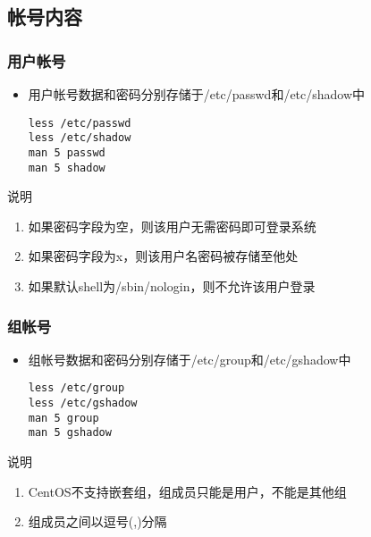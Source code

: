 \documentclass[xcolor=svgnames,presentation]{beamer}
\begin{document}
\subsection{帐号内容}
\label{sec-1-2}
\begin{frame}[fragile]
\frametitle{用户帐号}
\label{sec-1-2-1}
\begin{itemize}

\item 用户帐号数据和密码分别存储于/etc/passwd和/etc/shadow中\\
\label{sec-1-2-1-1}%
\begin{verbatim}
less /etc/passwd
less /etc/shadow
man 5 passwd
man 5 shadow
\end{verbatim}
\end{itemize} %
\begin{exampleblock}{说明}
\label{sec-1-2-1-2}

\begin{enumerate}
\item 如果密码字段为空，则该用户无需密码即可登录系统
\item 如果密码字段为x，则该用户名密码被存储至他处
\item 如果默认shell为/sbin/nologin，则不允许该用户登录
\end{enumerate}
\end{exampleblock}
\end{frame}
\begin{frame}[fragile]
\frametitle{组帐号}
\label{sec-1-2-2}
\begin{itemize}

\item 组帐号数据和密码分别存储于/etc/group和/etc/gshadow中\\
\label{sec-1-2-2-1}%
\begin{verbatim}
less /etc/group
less /etc/gshadow
man 5 group
man 5 gshadow
\end{verbatim}
\end{itemize} %
\begin{exampleblock}{说明}
\label{sec-1-2-2-2}

\begin{enumerate}
\item CentOS不支持嵌套组，组成员只能是用户，不能是其他组
\item 组成员之间以逗号(,)分隔
\end{enumerate}
\end{exampleblock}
\end{frame}
\end{document}
